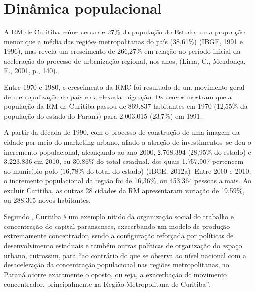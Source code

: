 	\section{Dinâmica populacional}
	
	A RM de Curitiba reúne cerca de 27\% da população do Estado,  uma proporção menor que a média das regiões metropolitanas do país (38,61\%) (IBGE, 1991 e 1996), mas revela um  crescimento de 266,27\% em relação ao período inicial da aceleração do processo de urbanização regional, nos anos, (Lima, C., Mendonça, F., 2001, p., 140).
	
	Entre 1970 e 1980, o crescimento da RMC foi resultado de um movimento geral de metropolização do país e da elevada migração. Os censos mostram que a população da RM de Curitiba passou de 869.837 habitantes em 1970 (12,55\% da população do estado do Paraná) para 2.003.015 (23,7\%) em 1991.
	
	A partir da década de 1990, com o processo de construção de uma imagem da cidade por meio do marketing urbano, aliado a atração de investimentos, se deu o incremento populacional, alcançando ao ano 2000, 2.768.394 (28,95\% do estado) e 3.223.836 em 2010, ou 30,86\% do total estadual, dos quais 1.757.907 pertencem ao município-polo (16,78\% do total do estado) (IBGE, 2012a). Entre 2000 e 2010, o incremento populacional da região foi de 16,36\%, ou 453.364 pessoas a mais. Ao excluir Curitiba, as outras 28 cidades da RM apresentaram variação de 19,59\%, ou 288.305 novos habitantes.
	
	Segundo , Curitiba é um exemplo nítido da organização social do trabalho e concentração do capital paranaenses, exacerbando um modelo de produção extremamente concentrador, sendo a configuração reforçada por políticas de desenvolvimento estaduais e também outras políticas de organização do espaço urbano, outrossim, para  ``ao contrário do que se observa ao nível nacional com a desaceleração da concentração populacional nas regiões metropolitanas, no Paraná ocorre exatamente o oposto, ou seja, a exacerbação do movimento concentrador, principalmente na Região Metropolitana de Curitiba''.
	
